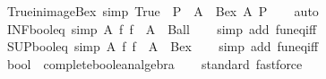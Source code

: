 \begin{isabellebody}
\isamarkupfalse%
\ True{\isacharunderscore}{\kern0pt}in{\isacharunderscore}{\kern0pt}image{\isacharunderscore}{\kern0pt}Bex\ {\isacharbrackleft}{\kern0pt}simp{\isacharbrackright}{\kern0pt}{\isacharcolon}{\kern0pt}\ {\isachardoublequoteopen}True\ {\isasymin}\ P\ {\isacharbackquote}{\kern0pt}\ A\ {\isasymlongleftrightarrow}\ Bex\ A\ P{\isachardoublequoteclose}\isanewline
%
\isadelimproof
\ \ %
\endisadelimproof
%
\isatagproof
{}\isamarkupfalse%
\ auto%
\endisatagproof
{\isafoldproof}%
%
\isadelimproof
\isanewline
%
\endisadelimproof
\isanewline
{}\isamarkupfalse%
\ INF{\isacharunderscore}{\kern0pt}bool{\isacharunderscore}{\kern0pt}eq\ {\isacharbrackleft}{\kern0pt}simp{\isacharbrackright}{\kern0pt}{\isacharcolon}{\kern0pt}\ {\isachardoublequoteopen}{\isacharparenleft}{\kern0pt}{\isasymlambda}A\ f{\isachardot}{\kern0pt}\ {\isasymSqinter}{\isacharparenleft}{\kern0pt}f\ {\isacharbackquote}{\kern0pt}\ A{\isacharparenright}{\kern0pt}{\isacharparenright}{\kern0pt}\ {\isacharequal}{\kern0pt}\ Ball{\isachardoublequoteclose}\isanewline
%
\isadelimproof
\ \ %
\endisadelimproof
%
\isatagproof
{}\isamarkupfalse%
\ {\isacharparenleft}{\kern0pt}simp\ add{\isacharcolon}{\kern0pt}\ fun{\isacharunderscore}{\kern0pt}eq{\isacharunderscore}{\kern0pt}iff{\isacharparenright}{\kern0pt}%
\endisatagproof
{\isafoldproof}%
%
\isadelimproof
\isanewline
%
\endisadelimproof
\isanewline
{}\isamarkupfalse%
\ SUP{\isacharunderscore}{\kern0pt}bool{\isacharunderscore}{\kern0pt}eq\ {\isacharbrackleft}{\kern0pt}simp{\isacharbrackright}{\kern0pt}{\isacharcolon}{\kern0pt}\ {\isachardoublequoteopen}{\isacharparenleft}{\kern0pt}{\isasymlambda}A\ f{\isachardot}{\kern0pt}\ {\isasymSqunion}{\isacharparenleft}{\kern0pt}f\ {\isacharbackquote}{\kern0pt}\ A{\isacharparenright}{\kern0pt}{\isacharparenright}{\kern0pt}\ {\isacharequal}{\kern0pt}\ Bex{\isachardoublequoteclose}\isanewline
%
\isadelimproof
\ \ %
\endisadelimproof
%
\isatagproof
{}\isamarkupfalse%
\ {\isacharparenleft}{\kern0pt}simp\ add{\isacharcolon}{\kern0pt}\ fun{\isacharunderscore}{\kern0pt}eq{\isacharunderscore}{\kern0pt}iff{\isacharparenright}{\kern0pt}%
\endisatagproof
{\isafoldproof}%
%
\isadelimproof
\isanewline
%
\endisadelimproof
\isanewline
{}\isamarkupfalse%
\ bool\ {\isacharcolon}{\kern0pt}{\isacharcolon}{\kern0pt}\ complete{\isacharunderscore}{\kern0pt}boolean{\isacharunderscore}{\kern0pt}algebra\isanewline
%
\isadelimproof
\ \ %
\endisadelimproof
%
\isatagproof
{}\isamarkupfalse%
\ {\isacharparenleft}{\kern0pt}standard{\isacharcomma}{\kern0pt}\ fastforce{\isacharparenright}{\kern0pt}%

\end{isabellebody}
